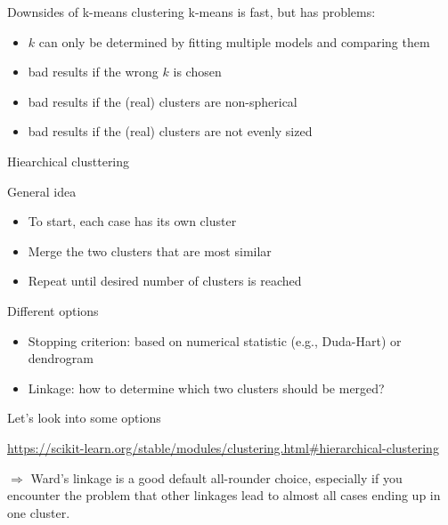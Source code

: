 \documentclass[compress]{beamer}
\begin{document}
\begin{frame}{Downsides of k-means clustering}
k-means is fast, but has problems:

\begin{itemize}
\item $k$ can only be determined by fitting multiple models and comparing them
\item bad results if the wrong $k$ is chosen
\item bad results if the (real) clusters are non-spherical
\item bad results if the (real) clusters are not evenly sized
\end{itemize}
\end{frame}


\begin{frame}{Hiearchical clusttering}
\begin{block}{General idea}
\begin{itemize}
\item To start, each case has its own cluster
\item Merge the two clusters that are most similar
\item Repeat until desired number of clusters is reached
\end{itemize}

\end{block}

\pause

\begin{block}{Different options}
\begin{itemize}
\item Stopping criterion: based on numerical statistic (e.g., Duda-Hart) or dendrogram
\item Linkage: how to determine which two clusters should be merged?
\end{itemize}

\end{block}
\end{frame}


\begin{frame}{Let's look into some options}

\url{https://scikit-learn.org/stable/modules/clustering.html\#hierarchical-clustering}

$\Rightarrow$ Ward's linkage is a good default all-rounder choice, especially if you encounter the problem that other linkages lead to almost all cases ending up in one cluster. 
\end{frame}
\end{document}
